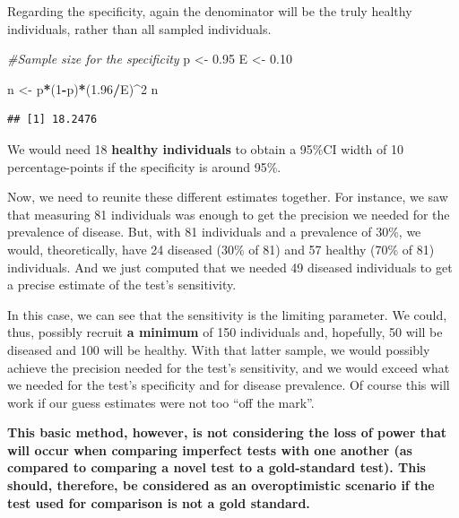 \documentclass[
]{book}
\newenvironment{Shaded}{\begin{snugshade}}{\end{snugshade}}
\newcommand{\CommentTok}[1]{\textcolor[rgb]{0.56,0.35,0.01}{\textit{#1}}}
\newcommand{\DecValTok}[1]{\textcolor[rgb]{0.00,0.00,0.81}{#1}}
\newcommand{\FloatTok}[1]{\textcolor[rgb]{0.00,0.00,0.81}{#1}}
\newcommand{\NormalTok}[1]{#1}
\newcommand{\OtherTok}[1]{\textcolor[rgb]{0.56,0.35,0.01}{#1}}
\newcommand{\SpecialCharTok}[1]{\textcolor[rgb]{0.81,0.36,0.00}{\textbf{#1}}}
\begin{document}
Regarding the specificity, again the denominator will be the truly healthy individuals, rather than all sampled individuals.

\begin{Shaded}
\begin{Highlighting}[]
\CommentTok{\#Sample size for the specificity}
\NormalTok{p }\OtherTok{\textless{}{-}} \FloatTok{0.95}
\NormalTok{E }\OtherTok{\textless{}{-}} \FloatTok{0.10}

\NormalTok{n }\OtherTok{\textless{}{-}}\NormalTok{ p}\SpecialCharTok{*}\NormalTok{(}\DecValTok{1}\SpecialCharTok{{-}}\NormalTok{p)}\SpecialCharTok{*}\NormalTok{(}\FloatTok{1.96}\SpecialCharTok{/}\NormalTok{E)}\SpecialCharTok{\^{}}\DecValTok{2}
\NormalTok{n}
\end{Highlighting}
\end{Shaded}

\begin{verbatim}
## [1] 18.2476
\end{verbatim}

We would need 18 \textbf{healthy individuals} to obtain a 95\%CI width of 10 percentage-points if the specificity is around 95\%.

Now, we need to reunite these different estimates together. For instance, we saw that measuring 81 individuals was enough to get the precision we needed for the prevalence of disease. But, with 81 individuals and a prevalence of 30\%, we would, theoretically, have 24 diseased (30\% of 81) and 57 healthy (70\% of 81) individuals. And we just computed that we needed 49 diseased individuals to get a precise estimate of the test's sensitivity.

In this case, we can see that the sensitivity is the limiting parameter. We could, thus, possibly recruit \textbf{a minimum} of 150 individuals and, hopefully, 50 will be diseased and 100 will be healthy. With that latter sample, we would possibly achieve the precision needed for the test's sensitivity, and we would exceed what we needed for the test's specificity and for disease prevalence. Of course this will work if our guess estimates were not too ``off the mark''.

\textbf{This basic method, however, is not considering the loss of power that will occur when comparing imperfect tests with one another (as compared to comparing a novel test to a gold-standard test). This should, therefore, be considered as an overoptimistic scenario if the test used for comparison is not a gold standard.}
\end{document}
